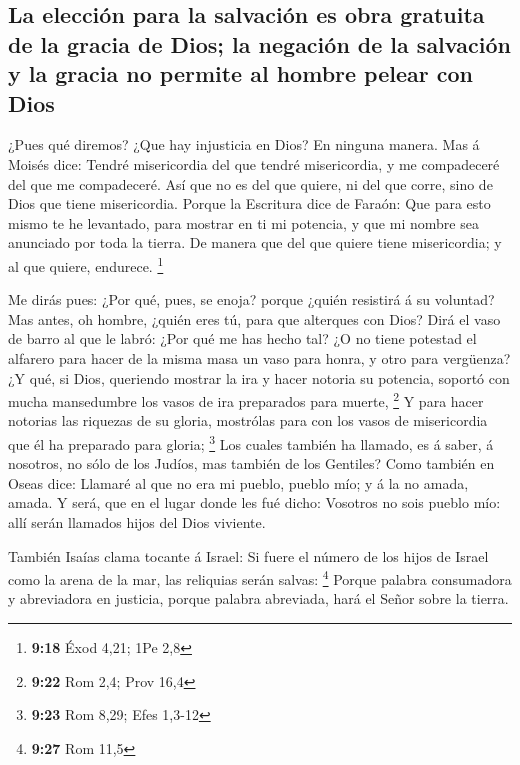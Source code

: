 \hypertarget{la-elecciuxf3n-para-la-salvaciuxf3n-es-obra-gratuita-de-la-gracia-de-dios-la-negaciuxf3n-de-la-salvaciuxf3n-y-la-gracia-no-permite-al-hombre-pelear-con-dios}{%
\subsection{La elección para la salvación es obra gratuita de la gracia
de Dios; la negación de la salvación y la gracia no permite al hombre
pelear con
Dios}\label{la-elecciuxf3n-para-la-salvaciuxf3n-es-obra-gratuita-de-la-gracia-de-dios-la-negaciuxf3n-de-la-salvaciuxf3n-y-la-gracia-no-permite-al-hombre-pelear-con-dios}}

 ¿Pues qué diremos? ¿Que hay injusticia en Dios? En ninguna
manera.  Mas á Moisés dice: Tendré misericordia del que
tendré misericordia, y me compadeceré del que me compadeceré.
 Así que no es del que quiere, ni del que corre, sino de
Dios que tiene misericordia.  Porque la Escritura dice de
Faraón: Que para esto mismo te he levantado, para mostrar en ti mi
potencia, y que mi nombre sea anunciado por toda la tierra.
 De manera que del que quiere tiene misericordia; y al que
quiere, endurece. \footnote{\textbf{9:18} Éxod 4,21; 1Pe 2,8}

 Me dirás pues: ¿Por qué, pues, se enoja? porque ¿quién
resistirá á su voluntad?  Mas antes, oh hombre, ¿quién eres
tú, para que alterques con Dios? Dirá el vaso de barro al que le labró:
¿Por qué me has hecho tal?  ¿O no tiene potestad el
alfarero para hacer de la misma masa un vaso para honra, y otro para
vergüenza?  ¿Y qué, si Dios, queriendo mostrar la ira y
hacer notoria su potencia, soportó con mucha mansedumbre los vasos de
ira preparados para muerte, \footnote{\textbf{9:22} Rom 2,4; Prov 16,4}
 Y para hacer notorias las riquezas de su gloria, mostrólas
para con los vasos de misericordia que él ha preparado para gloria;
\footnote{\textbf{9:23} Rom 8,29; Efes 1,3-12}  Los cuales
también ha llamado, es á saber, á nosotros, no sólo de los Judíos, mas
también de los Gentiles?  Como también en Oseas dice:
Llamaré al que no era mi pueblo, pueblo mío; y á la no amada, amada.
 Y será, que en el lugar donde les fué dicho: Vosotros no
sois pueblo mío: allí serán llamados hijos del Dios viviente.

 También Isaías clama tocante á Israel: Si fuere el número
de los hijos de Israel como la arena de la mar, las reliquias serán
salvas: \footnote{\textbf{9:27} Rom 11,5}  Porque palabra
consumadora y abreviadora en justicia, porque palabra abreviada, hará el
Señor sobre la tierra.

